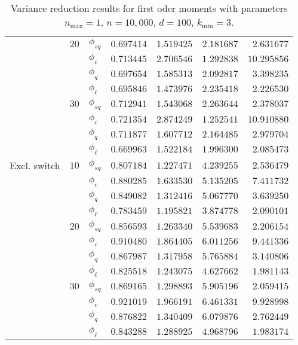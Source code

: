 \begin{table}[]
{\begin{tabular}{l@{\hskip 12pt}l@{\hskip 12pt}l@{\hskip 12pt}r@{\hskip 12pt}r@{\hskip 12pt}r@{\hskip 12pt}r}
            & $20$ &$\phi_{sq}$ &  $0.697414$ &  $1.519425$ &    $2.181687$ &   $2.631677$ \\
            &    &$\phi_{c}$ &  $0.713445$ &  $2.706546$ &    $1.292838$ &  $10.295856$ \\
            &    &$\phi_{q}$ &  $0.697654$ &  $1.585313$ &    $2.092817$ &   $3.398235$ \\
            &    & $\phi_{\ell}$ &  $0.695846$ &  $1.473976$ &    $2.235418$ &   $2.226530$ \\\cmidrule{2-7}
            & $30$ &$\phi_{sq}$ &  $0.712941$ &  $1.543068$ &    $2.263644$ &   $2.378037$ \\
            &    &$\phi_{c}$ &  $0.721354$ &  $2.874249$ &    $1.252541$ &  $10.910880$ \\
            &    &$\phi_{q}$ &  $0.711877$ &  $1.607712$ &    $2.164485$ &   $2.979704$ \\
            &    & $\phi_{\ell}$ &  $0.669963$ &  $1.522184$ &    $1.996300$ &   $2.085473$ \\\midrule
Excl. switch & $10$ &$\phi_{sq}$ &  $0.807184$ &  $1.227471$ &    $4.239255$ &   $2.536479$ \\
            &    &$\phi_{c}$ &  $0.880285$ &  $1.633530$ &    $5.135205$ &   $7.411732$ \\
            &    &$\phi_{q}$ &  $0.849082$ &  $1.312416$ &    $5.067770$ &   $3.639250$ \\
            &    & $\phi_{\ell}$ &  $0.783459$ &  $1.195821$ &    $3.874778$ &   $2.090101$ \\\cmidrule{2-7}
            & $20$ &$\phi_{sq}$ &  $0.856593$ &  $1.263340$ &    $5.539683$ &   $2.206154$ \\
            &    &$\phi_{c}$ &  $0.910480$ &  $1.864405$ &    $6.011256$ &   $9.441336$ \\
            &    &$\phi_{q}$ &  $0.867987$ &  $1.317958$ &    $5.765884$ &   $3.140806$ \\
            &    & $\phi_{\ell}$ &  $0.825518$ &  $1.243075$ &    $4.627662$ &   $1.981143$ \\\cmidrule{2-7}
            & $30$ &$\phi_{sq}$ &  $0.869165$ &  $1.298893$ &    $5.905196$ &   $2.059415$ \\
            &    &$\phi_{c}$ &  $0.921019$ &  $1.966191$ &    $6.461331$ &   $9.928998$ \\
            &    &$\phi_{q}$ &  $0.876822$ &  $1.340409$ &    $6.079876$ &   $2.762449$ \\
            &    & $\phi_{\ell}$ &  $0.843288$ &  $1.288925$ &    $4.968796$ &   $1.983174$ \\
\bottomrule
\end{tabular}}
    \caption[Variance reduction results for first oder moments]{Variance reduction results for first oder moments with parameters $n_{\max}=1$, $n=10,000$, $d=100$, $k_{\min}=3$.}
    \label{tab:eff1}
\end{table}
